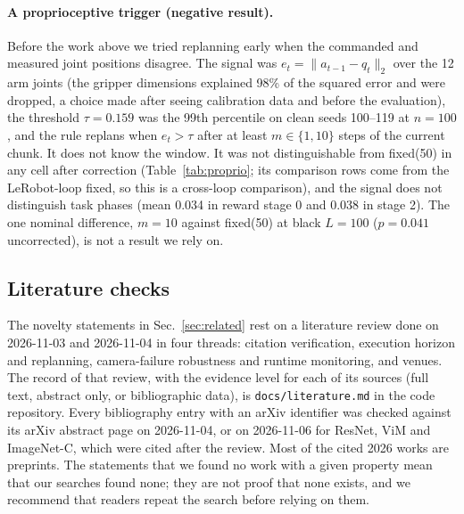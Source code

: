 \documentclass[11pt]{article}
\newcommand{\fixed}{\textsf{fixed}\xspace}
\begin{document}
\paragraph{A proprioceptive trigger (negative result).} Before the work above we tried replanning early when the commanded and measured joint positions disagree. The signal was $e_t=\lVert a_{t-1}-q_t\rVert_2$ over the 12 arm joints (the gripper dimensions explained 98\% of the squared error and were dropped, a choice made after seeing calibration data and before the evaluation), the threshold $\tau=0.159$ was the 99th percentile on clean seeds 100--119 at $n{=}100$, and the rule replans when $e_t>\tau$ after at least $m\in\{1,10\}$ steps of the current chunk. It does not know the window. It was not distinguishable from \fixed(50) in any cell after correction (Table~\ref{tab:proprio}; its comparison rows come from the LeRobot-loop \fixed, so this is a cross-loop comparison), and the signal does not distinguish task phases (mean 0.034 in reward stage 0 and 0.038 in stage 2). The one nominal difference, $m{=}10$ against \fixed(50) at black $L{=}100$ ($p=0.041$ uncorrected), is not a result we rely on.
\begin{table}[h]
\centering\small
\resizebox{\textwidth}{!}{}
\caption{Proprioceptive trigger, TC, 100 seeds. ``vs 50'': seeds where only proprio / only \fixed(50) succeeds; $p$ uncorrected.}
\label{tab:proprio}
\end{table}

\subsection{Literature checks}\label{app:lit}
The novelty statements in Sec.~\ref{sec:related} rest on a literature review done on 2026-11-03 and 2026-11-04 in four threads: citation verification, execution horizon and replanning, camera-failure robustness and runtime monitoring, and venues. The record of that review, with the evidence level for each of its sources (full text, abstract only, or bibliographic data), is \texttt{docs/literature.md} in the code repository. Every bibliography entry with an arXiv identifier was checked against its arXiv abstract page on 2026-11-04, or on 2026-11-06 for ResNet, ViM and ImageNet-C, which were cited after the review. Most of the cited 2026 works are preprints. The statements that we found no work with a given property mean that our searches found none; they are not proof that none exists, and we recommend that readers repeat the search before relying on them.
\end{document}
